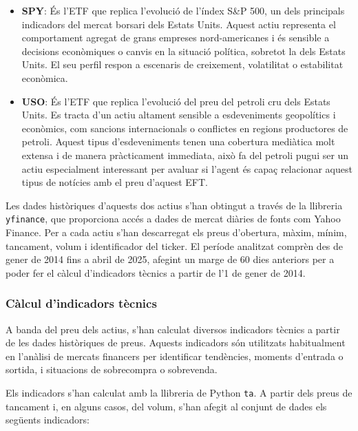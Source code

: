 \documentclass[12pt,a4paper,twoside]{book}
\begin{document}
\begin{itemize}
    \item \textbf{SPY}: És l'ETF que replica l'evolució de l'índex S\&P 500, un dels principals indicadors del mercat borsari dels Estats Units. Aquest actiu representa el comportament agregat de grans empreses nord-americanes i és sensible a decisions econòmiques o canvis en la situació política, sobretot la dels Estats Units. El seu perfil respon a escenaris de creixement, volatilitat o estabilitat econòmica.

    \item \textbf{USO}: És l'ETF que replica l'evolució del preu del petroli cru dels Estats Units. Es tracta d'un actiu altament sensible a esdeveniments geopolítics i econòmics, com sancions internacionals o conflictes en regions productores de petroli. Aquest tipus d'esdeveniments tenen una cobertura mediàtica molt extensa i de manera pràcticament immediata, això fa del petroli pugui ser un actiu especialment interessant per avaluar si l'agent és capaç relacionar aquest tipus de notícies amb el preu d'aquest EFT.

\end{itemize}

Les dades històriques d'aquests dos actius s'han obtingut a través de la llibreria \texttt{yfinance}, que proporciona accés a dades de mercat diàries de fonts com Yahoo Finance. Per a cada actiu s'han descarregat els preus d'obertura, màxim, mínim, tancament, volum i identificador del ticker. El període analitzat comprèn des de gener de 2014 fins a abril de 2025, afegint un marge de 60 dies anteriors per a poder fer el càlcul d'indicadors tècnics a partir de l'1 de gener de 2014.

\subsubsection*{Càlcul d'indicadors tècnics}

A banda del preu dels actius, s'han calculat diversos indicadors tècnics a partir de les dades històriques de preus. Aquests indicadors són utilitzats habitualment en l'anàlisi de mercats financers per identificar tendències, moments d'entrada o sortida, i situacions de sobrecompra o sobrevenda.

Els indicadors s'han calculat amb la llibreria de Python \texttt{ta}. A partir dels preus de tancament i, en alguns casos, del volum, s'han afegit al conjunt de dades els següents indicadors:
\end{document}
